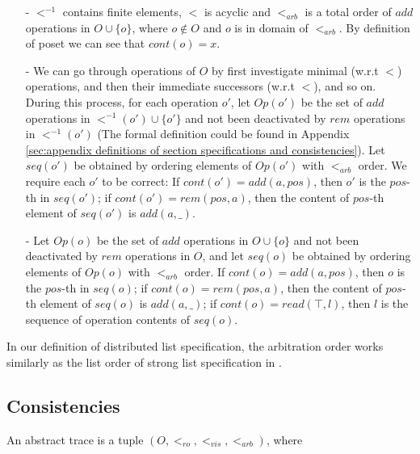 \begin{itemize}
\setlength{\itemsep}{0.5pt}
\item[-] $<^{-1}$ contains finite elements, $<$ is acyclic and $<_{\textit{arb}}$ is a total order of $add$ operations in $O \cup \{ o \}$, where $o \notin O$ and $o$ is in domain of $<_{\textit{arb}}$. By definition of poset we can see that $cont(o)=x$.

\item[-] We can go through operations of $O$ by first investigate minimal (w.r.t $<$) operations, and then their immediate successors (w.r.t $<$), and so on. During this process, for each operation $o'$, let $Op(o')$ be the set of $add$ operations in $<^{-1}(o') \cup \{ o' \}$ and not been deactivated by $rem$ operations in $<^{-1}(o')$ (The formal definition could be found in Appendix \ref{sec:appendix definitions of section specifications and consistencies}). Let $seq(o')$ be obtained by ordering elements of $Op(o')$ with $<_{\textit{arb}}$ order. We require each $o'$ to be correct: If $cont(o')=add(a,pos)$, then $o'$ is the $pos$-th in $seq(o')$; if $cont(o')=rem(pos,a)$, then the content of $pos$-th element of $seq(o')$ is $add(a,\_)$.

\item[-] {\color {red}Let $Op(o)$ be the set of $add$ operations in $O \cup \{ o \}$ and not been deactivated by $rem$ operations in $O$, and let $seq(o)$ be obtained by ordering elements of $Op(o)$ with $<_{\textit{arb}}$ order.} If $cont(o)=add(a,pos)$, then $o$ is the $pos$-th in $seq(o)$; if $cont(o)=rem(pos,a)$, then the content of $pos$-th element of $seq(o)$ is $add(a,\_)$; if $cont(o)=read(\top,l)$, then $l$ is the sequence of operation contents of $seq(o)$.
\end{itemize}

In our definition of distributed list specification, the arbitration order works similarly as the list order of strong list specification in \cite{Attiya:2016}.





\subsection{Consistencies}
\label{subsec:consistencies}

An abstract trace is a tuple $(O,<_{\textit{ro}},<_{\textit{vis}},<_{\textit{arb}})$, where


